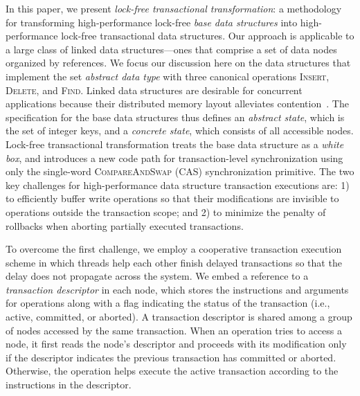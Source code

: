 \documentclass{sig-alternate-05-2015}
\begin{document}
In this paper, we present \emph{lock-free transactional transformation}: a methodology for transforming high-performance lock-free \emph{base data structures} into high-performance lock-free transactional data structures.
Our approach is applicable to a large class of linked data structures---ones that comprise a set of data nodes organized by references. 
We focus our discussion here on the data structures that implement the set \emph{abstract data type} with three canonical operations \textsc{Insert}, \textsc{Delete}, and \textsc{Find}.
Linked data structures are desirable for concurrent applications because their distributed memory layout alleviates contention~\cite{shavit1999scalable}.
The specification for the base data structures thus defines an \emph{abstract state}, which is the set of integer keys, and a \emph{concrete state}, which consists of all accessible nodes.
Lock-free transactional transformation treats the base data structure as a \emph{white box}, and introduces a new code path for transaction-level synchronization using only the single-word \textsc{CompareAndSwap} (CAS) synchronization primitive.
The two key challenges for high-performance data structure transaction executions are: 1) to efficiently buffer write operations so that their modifications are invisible to operations outside the transaction scope; and 2) to minimize the penalty of rollbacks when aborting partially executed transactions. 

To overcome the first challenge, we employ a cooperative transaction execution scheme in which threads help each other finish delayed transactions so that the delay does not propagate across the system.
We embed a reference to a \emph{transaction descriptor} in each node, which stores the instructions and arguments for operations along with a flag indicating the status of the transaction (i.e., active, committed, or aborted).
A transaction descriptor is shared among a group of nodes accessed by the same transaction. 
When an operation tries to access a node, it first reads the node's descriptor and proceeds with its modification only if the descriptor indicates the previous transaction has committed or aborted. 
Otherwise, the operation helps execute the active transaction according to the instructions in the descriptor.
\end{document}
